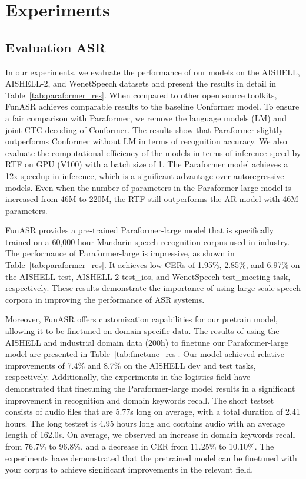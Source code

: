 \documentclass{INTERSPEECH2023}
\begin{document}
\section{Experiments}


\subsection{Evaluation ASR}

In our experiments, we evaluate the performance of our models on the AISHELL, AISHELL-2, and WenetSpeech datasets and present the results in detail in Table~\ref{tab:paraformer_res}. When compared to other open source toolkits, FunASR achieves comparable results to the baseline Conformer model. To ensure a fair comparison with Paraformer, we remove the language models (LM) and joint-CTC decoding of Conformer. The results show that Paraformer slightly outperforms Conformer without LM in terms of recognition accuracy. We also evaluate the computational efficiency of the models in terms of inference speed by RTF on GPU (V100) with a batch size of 1. The Paraformer model achieves a 12x speedup in inference, which is a significant advantage over autoregressive models. Even when the number of parameters in the Paraformer-large model is increased from 46M to 220M, the RTF still outperforms the AR model with 46M parameters.

FunASR provides a pre-trained Paraformer-large model that is specifically trained on a 60,000 hour Mandarin speech recognition corpus used in industry. The performance of Paraformer-large is impressive, as shown in Table~\ref{tab:paraformer_res}. It achieves low CERs of 1.95\%, 2.85\%, and 6.97\% on the AISHELL test, AISHELL-2 test\_ios, and WenetSpeech test\_meeting task, respectively. These results demonstrate the importance of using large-scale speech corpora in improving the performance of ASR systems.

Moreover, FunASR offers customization capabilities for our pretrain model, allowing it to be finetuned on domain-specific data. The results of using the AISHELL and industrial domain data (200h) to finetune our Paraformer-large model are presented in Table~\ref{tab:finetune_res}. Our model achieved relative improvements of 7.4\% and 8.7\% on the AISHELL dev and test tasks, respectively. Additionally, the experiments in the logistics field have demonstrated that finetuning the Paraformer-large model results in a significant improvement in recognition and domain keywords recall. The short testset consists of audio files that are 5.77s long on average, with a total duration of 2.41 hours. The long testset is 4.95 hours long and contains audio with an average length of 162.0s. On average, we observed an increase in domain keywords recall from 76.7\% to 96.8\%, and a decrease in CER from 11.25\% to 10.10\%. The experiments have demonstrated that the pretrained model can be finetuned with your corpus to achieve significant improvements in the relevant field.
\end{document}
